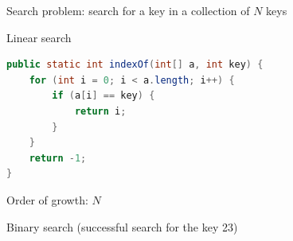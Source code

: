 \documentclass[8pt,a4paper,compress]{beamer}
\begin{document}
\begin{frame}[fragile]
\pause

Search problem: search for a key in a collection of $N$ keys

\pause
\bigskip

Linear search
\begin{lstlisting}[language=Java]
public static int indexOf(int[] a, int key) {
    for (int i = 0; i < a.length; i++) {
        if (a[i] == key) { 
            return i; 
        }
    }
    return -1;
}
\end{lstlisting}

\pause

Order of growth: $N$

\pause
\bigskip

Binary search (successful search for the key 23)
\begin{center}
\end{center}
\end{frame}
\end{document}
